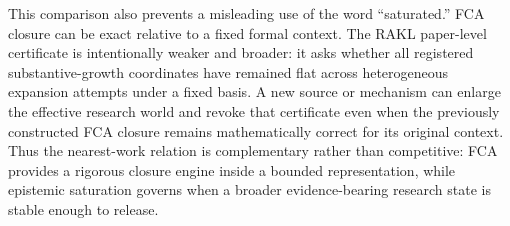 This comparison also prevents a misleading use of the word ``saturated.'' FCA closure can be exact relative to a fixed formal context. The RAKL paper-level certificate is intentionally weaker and broader: it asks whether all registered substantive-growth coordinates have remained flat across heterogeneous expansion attempts under a fixed basis. A new source or mechanism can enlarge the effective research world and revoke that certificate even when the previously constructed FCA closure remains mathematically correct for its original context. Thus the nearest-work relation is complementary rather than competitive: FCA provides a rigorous closure engine inside a bounded representation, while epistemic saturation governs when a broader evidence-bearing research state is stable enough to release.
